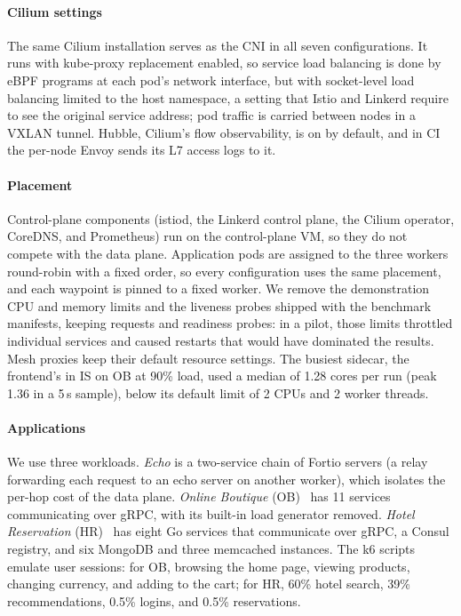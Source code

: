 \paragraph{Cilium settings}
The same Cilium installation serves as the CNI in all seven configurations. It
runs with kube-proxy replacement enabled, so service load balancing is done by
eBPF programs at each pod's network interface, but with socket-level load
balancing limited to the host namespace, a setting that Istio and Linkerd
require to see the original service address; pod traffic is carried between
nodes in a VXLAN tunnel. Hubble, Cilium's flow observability, is on by
default, and in CI the per-node Envoy sends its L7 access logs to it.

\paragraph{Placement}
Control-plane components (istiod, the Linkerd control plane, the Cilium
operator, CoreDNS, and Prometheus) run on the control-plane VM, so they do not
compete with the data plane. Application pods are assigned to the three workers
round-robin with a fixed order, so every configuration uses the same placement,
and each waypoint is pinned to a fixed worker. We remove the demonstration CPU
and memory limits and the liveness probes shipped with the benchmark manifests,
keeping requests and readiness probes: in a pilot, those limits throttled
individual services and caused restarts that would have dominated the
results. Mesh proxies keep their default resource settings. The busiest sidecar, the
frontend's in IS on OB at 90\% load, used a median of 1.28 cores per run
(peak 1.36 in a 5\,s sample), below its default limit of 2 CPUs and 2 worker
threads.

\paragraph{Applications}
We use three workloads. \emph{Echo} is a two-service chain of Fortio
servers (a relay forwarding each request to an echo server on another worker),
which isolates the per-hop cost of the data plane. \emph{Online Boutique}
(OB)~\cite{onlineboutique} has 11 services communicating over gRPC, with its
built-in load generator removed. \emph{Hotel Reservation}
(HR)~\cite{gan2019deathstarbench} has eight Go services that communicate over
gRPC, a Consul registry, and six MongoDB and three memcached instances. The k6 scripts emulate user sessions: for OB, browsing the home
page, viewing products, changing currency, and adding to the cart; for HR, 60\%
hotel search, 39\% recommendations, 0.5\% logins, and 0.5\% reservations.

